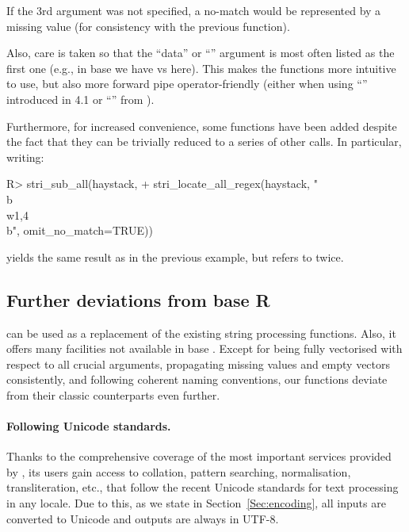 \documentclass[nojss]{jss}
\begin{document}
If the 3rd argument was not specified, a no-match
would be represented by a missing value (for consistency with the
previous function).


Also, care is taken so that the ``data'' or ``''
argument is most often listed as the first one
(e.g., in base  we have 
vs  here).
This makes the functions more intuitive to use,
but also more forward pipe operator-friendly
(either when using ``\code{|>}'' introduced in  4.1
or ``\code{\%>\%}'' from ).


Furthermore, for increased convenience, some functions have been added
despite the fact that they can be trivially reduced to a series of
other calls.
In particular, writing:

\begin{Schunk}
\begin{Sinput}
R> stri_sub_all(haystack,
+    stri_locate_all_regex(haystack, "\\b\\w{1,4}\\b", omit_no_match=TRUE))
\end{Sinput}
\end{Schunk}

\noindent
yields the same result as in the previous example,
but refers to  twice.


\subsection{Further deviations from base R}

 can be used as a replacement of the existing string
processing functions. Also, it offers many
facilities not available in base .
Except for being fully vectorised with respect to all crucial
arguments, propagating missing values and empty vectors consistently,
and following coherent naming conventions, our functions
deviate from their classic counterparts even further.






\paragraph{Following Unicode standards.}
Thanks to the comprehensive coverage of the most important
services provided by , its users gain access to
collation, pattern searching, normalisation, transliteration, etc.,
that follow the recent Unicode standards for text processing
in any locale.
Due to this, as we state in Section~\ref{Sec:encoding},
all inputs are converted to Unicode and outputs are always
in UTF-8.
\end{document}

